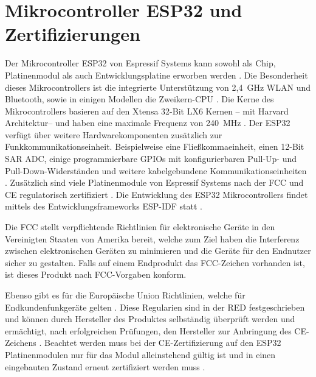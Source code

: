 
\section{Mikrocontroller ESP32 und Zertifizierungen}
\label{section:esp32Explained}
Der Mikrocontroller ESP32 von Espressif Systems kann sowohl als Chip, Platinenmodul als auch Entwicklungsplatine erworben werden \cites{espressifModules}{espressifDevKit}{espressifSoC}. Die Besonderheit dieses Mikrocontrollers ist die integrierte Unterstützung von 2,4~GHz \acs{WLAN} und Bluetooth, sowie in einigen Modellen die Zweikern-\acs{CPU} \cites{espressifGetStarted}[S.~8]{espressifTechnicalReference}[S.~24]{espressifTechnicalReference}. Die Kerne des Mikrocontrollers basieren auf den Xtensa 32-Bit LX6 Kernen -- mit Harvard Architektur-- und haben eine maximale Frequenz von 240~MHz \cites{espressifGetStarted}[S.~9]{espressifTechnicalReference}[S.~8]{espressifTechnicalReference}[S.~24]{espressifTechnicalReference}. Der ESP32 verfügt über weitere Hardwarekomponenten zusätzlich zur Funkkommunikationseinheit. Beispielweise eine Fließkommaeinheit, einen 12-Bit \ac{SAR} \ac{ADC}, einige programmierbare \acfp{GPIO} mit konfigurierbaren Pull-Up- und Pull-Down-Widerständen und weitere kabelgebundene Kommunikationseinheiten \cites[S.~10f.]{espressifTechnicalReference}[S.~23]{espressifTechnicalReference}[S.~34]{espressifTechnicalReference}. Zusätzlich sind viele Platinenmodule von Espressif Systems nach der  \ac{FCC} \cite{fccApproval} und \ac{CE} regulatorisch zertifiziert \cite{espressifCertificates}. Die Entwicklung des ESP32 Mikrocontrollers findet mittels des Entwicklungsframeworks \ac{ESP-IDF} statt \cites{espressifGetStarted}{espressifIDF}. 

Die \ac{FCC} stellt verpflichtende Richtlinien für elektronische Geräte in den Vereinigten Staaten von Amerika bereit, welche zum Ziel haben die Interferenz zwischen elektronischen Geräten zu minimieren und die Geräte für den Endnutzer sicher zu gestalten. Falls auf einem Endprodukt das \ac{FCC}-Zeichen vorhanden ist, ist dieses Produkt nach \ac{FCC}-Vorgaben konform. \cite{fccApproval}

Ebenso gibt es für die Europäische Union Richtlinien, welche für Endkundenfunkgeräte gelten \cites{europeanCEMarking}{europeanRED}. Diese Regularien sind in der \ac{RED} festgeschrieben und können durch Hersteller des Produktes selbständig überprüft werden und ermächtigt, nach erfolgreichen Prüfungen, den Hersteller zur Anbringung des \ac{CE}-Zeichens \cite[S.~14]{europeanFunkanalagen}. Beachtet werden muss bei der \ac{CE}-Zertifizierung auf den ESP32 Platinenmodulen nur für das Modul alleinstehend gültig ist und in einen eingebauten Zustand erneut zertifiziert werden muss \cite{naumannCE}.

